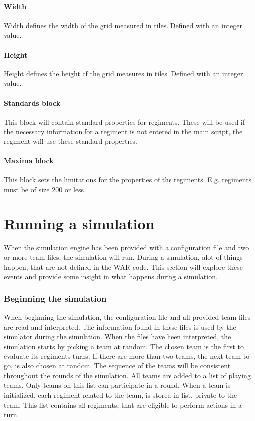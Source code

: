		\paragraph{Width}
		Width defines the width of the grid measured in tiles.
		Defined with an integer value.
		
		\paragraph{Height}
		Height defines the height of the grid measures in tiles.
		Defined with an integer value.
		
		\paragraph{Standards block}
		This block will contain standard properties for regiments. These will be used if the necessary 
		information for a regiment is not entered in the main script, the regiment will use these standard properties.
		
		\paragraph{Maxima block}
		This block sets the limitations for the properties of the regiments. E.g. regiments must be of size 200 or less.

\section{ Running a simulation }
	When the simulation engine has been provided with a configuration file and two or more team files, the simulation will run. During a simulation, alot of things happen, that are not defined in the WAR code. This section will explore these events and provide some insight in what happens during a simulation.
		\subsubsection{Beginning the simulation}
		When beginning the simulation, the configuration file and all provided team files are read and interpreted. The information found in these files is used by the simulator during the simulation. When the files have been interpreted, the simulation starts by picking a team at random. The chosen team is the first to evaluate its regiments turns. If there are more than two teams, the next team to go, is also chosen at random. The sequence of the teams will be consistent throughout the rounds of the simulation. All teams are added to a list of playing teams. Only teams on this list can participate in a round. When a team is initialized, each regiment related to the team, is stored in list, private to the team. This list contains all regiments, that are eligible to perform actions in a turn. 
